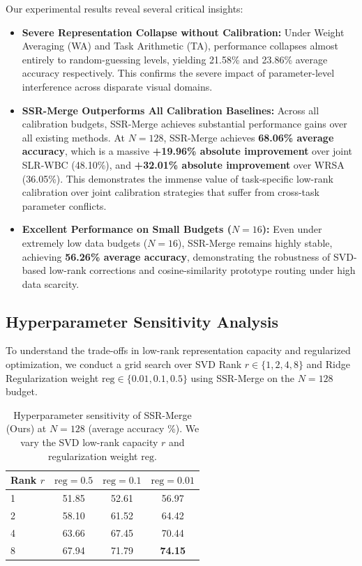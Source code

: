 \documentclass{article}
\theoremstyle{plain}
\theoremstyle{definition}
\theoremstyle{remark}
\begin{document}
Our experimental results reveal several critical insights:
\begin{itemize}
    \item \textbf{Severe Representation Collapse without Calibration:} Under Weight Averaging (WA) and Task Arithmetic (TA), performance collapses almost entirely to random-guessing levels, yielding 21.58\% and 23.86\% average accuracy respectively. This confirms the severe impact of parameter-level interference across disparate visual domains.
    \item \textbf{SSR-Merge Outperforms All Calibration Baselines:} Across all calibration budgets, SSR-Merge achieves substantial performance gains over all existing methods. At $N=128$, SSR-Merge achieves \textbf{68.06\% average accuracy}, which is a massive \textbf{+19.96\% absolute improvement} over joint SLR-WBC (48.10\%), and \textbf{+32.01\% absolute improvement} over WRSA (36.05\%). This demonstrates the immense value of task-specific low-rank calibration over joint calibration strategies that suffer from cross-task parameter conflicts.
    \item \textbf{Excellent Performance on Small Budgets ($N=16$):} Even under extremely low data budgets ($N=16$), SSR-Merge remains highly stable, achieving \textbf{56.26\% average accuracy}, demonstrating the robustness of SVD-based low-rank corrections and cosine-similarity prototype routing under high data scarcity.
\end{itemize}

\subsection{Hyperparameter Sensitivity Analysis}
To understand the trade-offs in low-rank representation capacity and regularized optimization, we conduct a grid search over SVD Rank $r \in \{1, 2, 4, 8\}$ and Ridge Regularization weight $\text{reg} \in \{0.01, 0.1, 0.5\}$ using SSR-Merge on the $N=128$ budget.

\begin{table}[h]
\caption{Hyperparameter sensitivity of SSR-Merge (Ours) at $N=128$ (average accuracy \%). We vary the SVD low-rank capacity $r$ and regularization weight $\text{reg}$.}
\label{tab:hyperparam}
\vskip 0.15in
\begin{center}
\begin{small}
\begin{tabular}{lccc}
\toprule
Rank $r$ & $\text{reg} = 0.5$ & $\text{reg} = 0.1$ & $\text{reg} = 0.01$ \\
\midrule
1 & 51.85 & 52.61 & 56.97 \\
2 & 58.10 & 61.52 & 64.42 \\
4 & 63.66 & 67.45 & 70.44 \\
8 & 67.94 & 71.79 & \textbf{74.15} \\
\bottomrule
\end{tabular}
\end{small}
\end{center}
\vskip -0.1in
\end{table}
\end{document}
